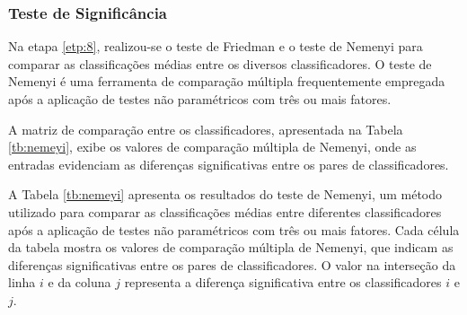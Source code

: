\subsubsection{Teste de Signific\^ancia}

Na etapa \ref{etp:8}, realizou-se o teste de Friedman e o teste de Nemenyi para comparar as classificações médias entre os diversos classificadores. O teste de Nemenyi é uma ferramenta de comparação múltipla frequentemente empregada após a aplicação de testes não paramétricos com três ou mais fatores.

A matriz de comparação entre os classificadores, apresentada na Tabela \ref{tb:nemeyi}, exibe os valores de comparação múltipla de Nemenyi, onde as entradas evidenciam as diferenças significativas entre os pares de classificadores.

A Tabela \ref{tb:nemeyi} apresenta os resultados do teste de Nemenyi, um método utilizado para comparar as classificações médias entre diferentes classificadores após a aplicação de testes não paramétricos com três ou mais fatores. Cada célula da tabela mostra os valores de comparação múltipla de Nemenyi, que indicam as diferenças significativas entre os pares de classificadores. O valor na interseção da linha $i$ e da coluna $j$ representa a diferença significativa entre os classificadores $i$ e $j$.

